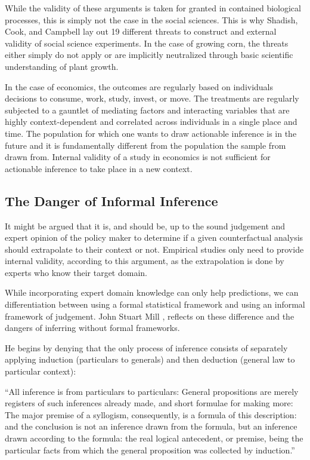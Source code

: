 \documentclass[a4paper,12pt]{article}
\begin{document}
While the validity of these arguments is taken for granted in contained biological processes, this is simply not the case in the social sciences. This is why Shadish, Cook, and Campbell lay out 19 different threats to construct and external validity of social science experiments. In the case of growing corn, the threats either simply do not apply or are implicitly neutralized through basic scientific understanding of plant growth.

In the case of economics, the outcomes are regularly based on individuals decisions to consume, work, study, invest, or move. The treatments are regularly subjected to a gauntlet of mediating factors and interacting variables that are highly context-dependent and correlated across individuals in a single place and time. The population for which one wants to draw actionable inference is in the future and it is fundamentally different from the population the sample from drawn from. Internal validity of a study in economics is not sufficient for actionable inference to take place in a new context. 

\subsection{The Danger of Informal Inference}

It might be argued that it is, and should be, up to the sound judgement and expert opinion of the policy maker to determine if a given counterfactual analysis should extrapolate to their context or not. Empirical studies only need to provide internal validity, according to this argument, as the extrapolation is done by experts who know their target domain.

While incorporating expert domain knowledge can only help predictions, we can differentiation between using a formal statistical framework and using an informal framework of judgement. John Stuart Mill \parencite*{mill1884}, reflects on these difference and the dangers of inferring without formal frameworks.

He begins by denying that the only process of inference consists of separately applying induction (particulars to generals) and then deduction (general law to particular context):

\begin{displayquote}
  ``All inference is from particulars to particulars: General propositions are merely registers of such inferences already made, and short formulae for making more: The major premise of a syllogism, consequently, is a formula of this description: and the conclusion is not an inference drawn from the formula, but an inference drawn according to the formula: the real logical antecedent, or premise, being the particular facts from which the general proposition was collected by induction.''  \parencite{mill1884}
\end{displayquote}
\end{document}
